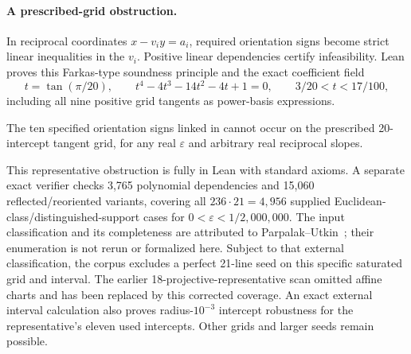 \paragraph{A prescribed-grid obstruction.}
In reciprocal coordinates $x-v_i y=a_i$, required orientation signs become strict linear inequalities in the $v_i$. Positive linear dependencies certify infeasibility. Lean proves this Farkas-type soundness principle and the exact coefficient field
\[
 t=\tan(\pi/20),\qquad t^4-4t^3-14t^2-4t+1=0,\qquad3/20<t<17/100,
\]
including all nine positive grid tangents as power-basis expressions.
\begin{proposition}\label{j:obstruction}
The ten specified orientation signs linked in  cannot occur on the prescribed 20-intercept tangent grid, for any real $\varepsilon$ and arbitrary real reciprocal slopes.
\end{proposition}
This representative obstruction is fully in Lean with standard axioms. A separate exact verifier checks 3,765 polynomial dependencies and 15,060 reflected/reoriented variants, covering all $236\cdot21=4,956$ supplied Euclidean-class/distinguished-support cases for $0<\varepsilon<1/2{,}000{,}000$. The input classification and its completeness are attributed to Parpalak--Utkin~\cite{parpalakutkinEnumeration2026}; their enumeration is not rerun or formalized here. Subject to that external classification, the corpus excludes a perfect 21-line seed on this specific saturated grid and interval. The earlier 18-projective-representative scan omitted affine charts and has been replaced by this corrected coverage. An exact external interval calculation also proves radius-$10^{-3}$ intercept robustness for the representative's eleven used intercepts. Other grids and larger seeds remain possible.

